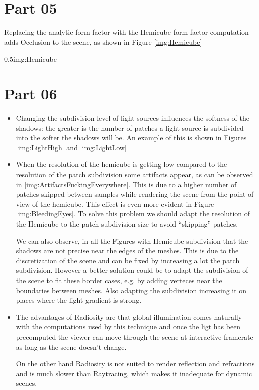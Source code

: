   \section {Part 05}
    
    Replacing the analytic form factor with the Hemicube form factor computation adds Occlusion to the scene,
    as shown in Figure \ref{img:Hemicube}

          {0.5}{img:Hemicube}
    
  \section {Part 06}

    \begin{itemize}
      \item Changing the subdivision level of light sources influences the softness of the shadows: the greater is the
            number of patches a light source is subdivided into the softer the shadows will be. An example of this
            is shown in Figures \ref{img:LightHigh} and \ref{img:LightLow}
      \item When the resolution of the hemicube is getting low compared to the resolution of the patch subdivision some
            artifacts appear, as can be observed in \ref{img:ArtifactsFuckingEverywhere}. This is due to a higher number of
            patches skipped between samples while rendering the scene from the point of view of the hemicube. This effect
            is even more evident in Figure \ref{img:BleedingEyes}. To solve this problem we should adapt the resolution of
            the Hemicube to the patch subdivision size to avoid ``skipping'' patches.
            
            We can also observe, in all the Figures with Hemicube subdivision that the shadows are not precise near the edges of the meshes.
            This is due to the discretization of the scene and can be fixed by increasing a lot the patch subdivision. However
            a better solution could be to adapt the subdivision of the scene to fit these border cases, e.g. by adding verteces near the
            boundaries between meshes. Also adapting the subdivision increasing it on places where the light gradient is strong.
      \item The advantages of Radiosity are that global illumination comes naturally with the computations used by this technique and
            once the ligt has been precomputed the viewer can move through the scene at interactive framerate as long as the scene
            doesn't change.

            On the other hand Radiosity is not suited to render reflection and refractions and is much slower than Raytracing,
            which makes it inadequate for dynamic scenes.
    \end{itemize}

